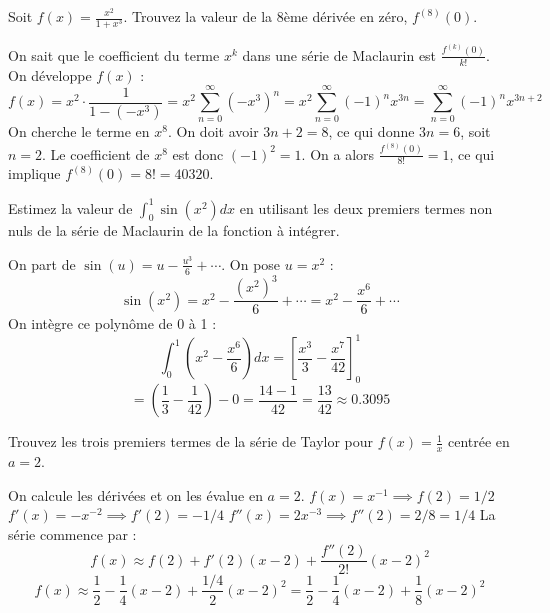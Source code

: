 \begin{exercicebox}
Soit $f(x) = \frac{x^2}{1+x^3}$. Trouvez la valeur de la 8ème dérivée en zéro, $f^{(8)}(0)$.
\end{exercicebox}

\begin{correctionbox}
On sait que le coefficient du terme $x^k$ dans une série de Maclaurin est $\frac{f^{(k)}(0)}{k!}$.
On développe $f(x)$ :
$$ f(x) = x^2 \cdot \frac{1}{1-(-x^3)} = x^2 \sum_{n=0}^{\infty} (-x^3)^n = x^2 \sum_{n=0}^{\infty} (-1)^n x^{3n} = \sum_{n=0}^{\infty} (-1)^n x^{3n+2} $$
On cherche le terme en $x^8$. On doit avoir $3n+2=8$, ce qui donne $3n=6$, soit $n=2$.
Le coefficient de $x^8$ est donc $(-1)^2 = 1$.
On a alors $\frac{f^{(8)}(0)}{8!} = 1$, ce qui implique $f^{(8)}(0) = 8! = 40320$.
\end{correctionbox}

\begin{exercicebox}
Estimez la valeur de $\int_0^1 \sin(x^2) dx$ en utilisant les deux premiers termes non nuls de la série de Maclaurin de la fonction à intégrer.
\end{exercicebox}

\begin{correctionbox}
On part de $\sin(u) = u - \frac{u^3}{6} + \cdots$. On pose $u=x^2$ :
$$ \sin(x^2) = x^2 - \frac{(x^2)^3}{6} + \cdots = x^2 - \frac{x^6}{6} + \cdots $$
On intègre ce polynôme de 0 à 1 :
$$ \int_0^1 \left(x^2 - \frac{x^6}{6}\right) dx = \left[ \frac{x^3}{3} - \frac{x^7}{42} \right]_0^1 $$
$$ = \left(\frac{1}{3} - \frac{1}{42}\right) - 0 = \frac{14 - 1}{42} = \frac{13}{42} \approx 0.3095 $$
\end{correctionbox}

\begin{exercicebox}
Trouvez les trois premiers termes de la série de Taylor pour $f(x) = \frac{1}{x}$ centrée en $a=2$.
\end{exercicebox}

\begin{correctionbox}
On calcule les dérivées et on les évalue en $a=2$.
$f(x) = x^{-1} \implies f(2) = 1/2$
$f'(x) = -x^{-2} \implies f'(2) = -1/4$
$f''(x) = 2x^{-3} \implies f''(2) = 2/8 = 1/4$
La série commence par :
$$ f(x) \approx f(2) + f'(2)(x-2) + \frac{f''(2)}{2!}(x-2)^2 $$
$$ f(x) \approx \frac{1}{2} - \frac{1}{4}(x-2) + \frac{1/4}{2}(x-2)^2 = \frac{1}{2} - \frac{1}{4}(x-2) + \frac{1}{8}(x-2)^2 $$
\end{correctionbox}

